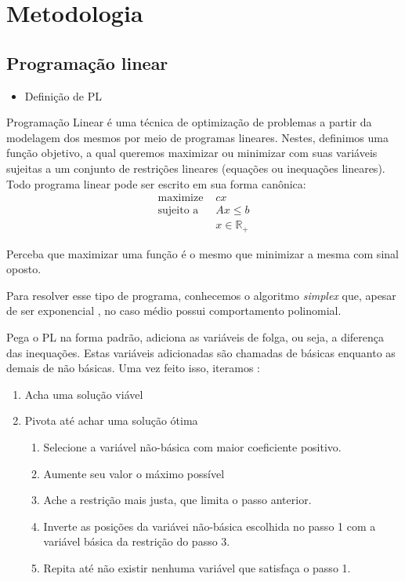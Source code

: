\documentclass[11pt]{article}
\begin{document}
{\section{Metodologia}
\label{sec:orge63a0a7}

\subsection{Programação linear}
\label{sec:org42ce7bc}
\begin{itemize}
\item Definição de PL
\end{itemize}
Programação Linear é uma técnica de optimização de problemas a partir da modelagem dos mesmos por meio de programas lineares.
Nestes, definimos uma função objetivo, a qual queremos maximizar ou minimizar com suas variáveis sujeitas a um conjunto de restrições lineares (equações ou inequações lineares).  Todo programa linear pode ser escrito em sua forma canônica:
\begin{align*}
\text{maximize }  &cx \\
\text{sujeito a } &Ax \leq b \\
                  &x \in \mathbb{R}_+
\end{align*}

Perceba que maximizar uma função é o mesmo que minimizar a mesma com sinal oposto.

Para resolver esse tipo de programa, conhecemos o algoritmo \emph{simplex} que, apesar de ser exponencial , no caso médio possui comportamento polinomial.

Pega o PL na forma padrão, adiciona as variáveis de folga, ou seja, a diferença das inequações. Estas variáveis adicionadas são chamadas de básicas enquanto as demais de não básicas. Uma vez feito isso, iteramos :
\begin{enumerate}
\item Acha uma solução viável
\item Pivota até achar uma solução ótima
\begin{enumerate}
\item Selecione a variável não-básica com maior coeficiente positivo.
\item Aumente seu valor o máximo possível
\item Ache a restrição mais justa, que limita o passo anterior.
\item Inverte as posições da variávei não-básica escolhida no passo 1 com a variável básica da restrição do passo 3.
\item Repita até não existir nenhuma variável que satisfaça o passo 1.
\end{enumerate}
\end{enumerate}

}
\end{document}
